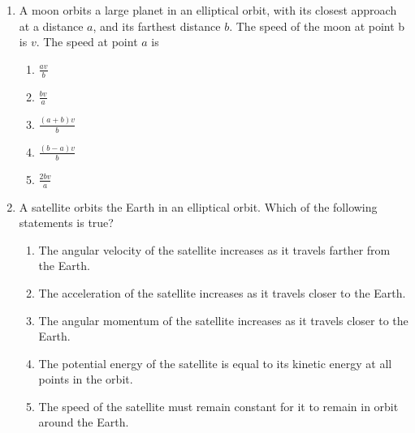 \documentclass[12pt]{article}
\begin{document}
\begin{enumerate}[leftmargin=50pt,label=\underline{\hspace{0.4in}} \arabic*.]
\item A moon orbits a large planet in an elliptical orbit, with its closest
  approach at a distance $a$, and its farthest distance $b$. The speed of the
  moon at point b is $v$. The speed at point $a$ is
  \begin{enumerate}[noitemsep,topsep=0pt,leftmargin=18pt]  
  \item$\displaystyle\frac{av}{b}$
  \item$\displaystyle\frac{bv}{a}$
  \item$\displaystyle\frac{(a+b)v}{b}$
  \item$\displaystyle\frac{(b-a)v}{b}$
  \item$\displaystyle\frac{2bv}{a}$
  \end{enumerate}


\item A satellite orbits the Earth in an elliptical orbit. Which of the
  following statements is true?
  \begin{enumerate}[noitemsep,topsep=0pt,leftmargin=18pt]  
  \item The angular velocity of the satellite increases as it travels
    farther from the Earth.
  \item The acceleration of the satellite increases as it travels closer
    to the Earth.
  \item The angular momentum of the satellite increases as it travels
    closer to the Earth.
  \item The potential energy of the satellite is equal to its kinetic
    energy at all points in the orbit.
  \item The speed of the satellite must remain constant for it to remain
    in orbit around the Earth.
  \end{enumerate}

  \begin{center}
  \end{center}
  

\end{enumerate}
\end{document}
